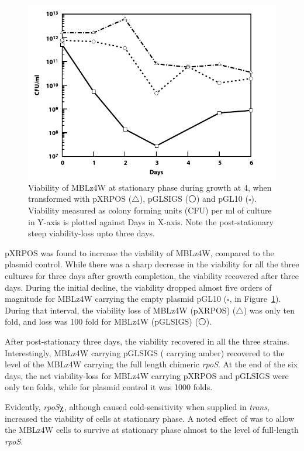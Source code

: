 \begin{figure}[tbp]
\includegraphics{figures/chap6_death}
\caption[Viability comparison of MBLz4W]{Viability of MBLz4W at
stationary phase during growth at 4\dg{}, when transformed with
pXRPOS ($\triangle$), pGLSIGS ($\medcirc$) and pGL10 ($\square$).
Viability measured as colony forming units (CFU) per ml of culture
in Y-axis is plotted against Days in X-axis. Note the
post-stationary steep viability-loss upto three days.}
\label{chap6:death}
\end{figure}

pXRPOS was found to increase  the viability of MBLz4W, compared to
the plasmid control. While there was a sharp decrease in the
viability for all the three cultures for three days after growth
completion, the viability recovered after three days. During the
initial decline, the viability dropped almost five orders of
magnitude for MBLz4W carrying the empty plasmid pGL10 ($\square$,
in Figure~\ref{chap6:death}). During that interval, the viability
loss of MBLz4W (pXRPOS) ($\triangle$) was only ten fold, and loss
was 100 fold for MBLz4W (pGLSIGS) ($\medcirc$).

After post-stationary three days, the viability recovered in all
the three strains. Interestingly, MBLz4W carrying pGLSIGS
( carrying amber) recovered to the level of the MBLz4W
carrying the full length chimeric \emph{rpoS}. At the end of the
six days, the net viability-loss for MBLz4W carrying pXRPOS and
pGLSIGS were only ten folds, while for plasmid control it was 1000
folds.

Evidently, \emph{rpoS}$\chiup$, although caused cold-sensitivity
when supplied in \emph{trans}, increased the viability of cells at
stationary phase. A noted effect of \lzsig{} was to allow the
MBLz4W cells to survive at stationary phase almost to the level of
full-length \emph{rpoS}.

